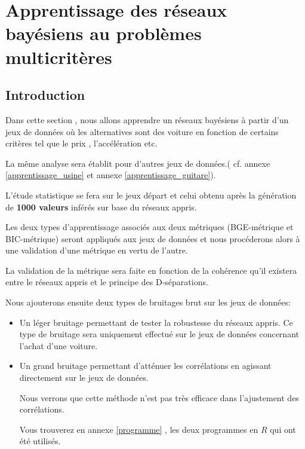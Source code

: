 \documentclass[a4paper]{article}
\begin{document}
\newpage

\section{Apprentissage des réseaux bayésiens au problèmes multicritères}

\subsection{Introduction}

Dans cette section , nous allons apprendre un réseaux bayésiens à partir d'un jeux de données où les alternatives sont des voiture en fonction de certains critères tel que le prix , l'accélération etc.


La même analyse sera établit pour d'autres jeux de données.( cf. annexe \ref{apprentissage_usine} et annexe \ref{apprentissage_guitare}). 
 
 L'étude statistique se fera sur le jeux départ et celui obtenu après la génération de \textbf{ 1000 valeurs} inférés sur base du réseaux appris.


Les deux types d'apprentissage associés aux deux métriques (BGE-métrique et BIC-métrique) seront appliqués aux jeux de données et nous procéderons alors à une validation d'une métrique en vertu de l'autre.

La validation de la métrique sera faite en fonction de la cohérence qu'il existera entre le réseaux appris et le principe des D-séparations.

 Nous ajouterons  ensuite deux types de bruitages brut sur les jeux de données:

\begin{itemize}
  \item Un léger bruitage permettant de tester la robustesse du réseaux appris. Ce type de bruitage sera uniquement  effectué sur le jeux de données concernant l'achat d'une voiture. 

  \item Un grand bruitage permettant d'atténuer les corrélations en agissant directement sur le jeux de données.

Nous verrons que cette méthode n'est pas très efficace dans l'ajustement des corrélations.

Vous trouverez en annexe \ref{programme} , les deux programmes en $R$ qui ont été utilisés.   

\end{itemize}
\end{document}

